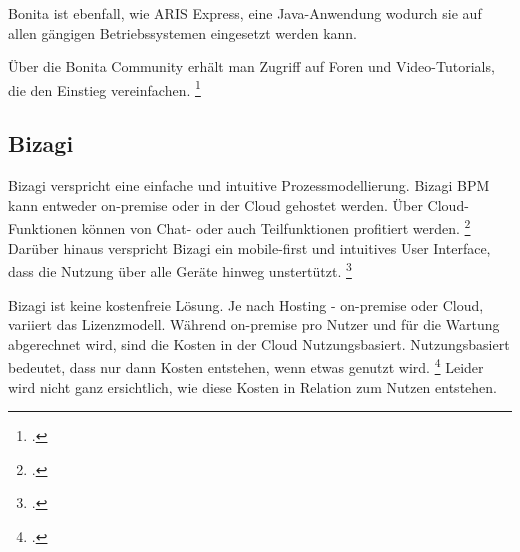 Bonita ist ebenfall, wie ARIS Express, eine Java-Anwendung wodurch sie auf allen
gängigen Betriebssystemen eingesetzt werden kann.

Über die Bonita Community erhält man Zugriff auf Foren und Video-Tutorials, die
den Einstieg vereinfachen. \footcite{bonitalernen}

\subsection{Bizagi}

Bizagi verspricht eine einfache und intuitive Prozessmodellierung.
Bizagi BPM kann entweder on-premise oder in der Cloud gehostet werden.
Über Cloud-Funktionen können von Chat- oder auch Teilfunktionen
profitiert werden. \footcite{bizagi} Darüber hinaus verspricht Bizagi ein
mobile-first und intuitives User Interface, dass die Nutzung über alle Geräte
hinweg unstertützt. \footcite{bizagimobile}


\begin{figure}[H]
\begin{minipage}{\linewidth}
\begin{center}
\end{center}
\end{minipage}
\end{figure}

Bizagi ist keine kostenfreie Lösung. Je nach Hosting - on-premise oder Cloud,
variiert das Lizenzmodell. Während on-premise pro Nutzer und für die Wartung
abgerechnet wird, sind die Kosten in der Cloud Nutzungsbasiert. Nutzungsbasiert
bedeutet, dass nur dann Kosten entstehen, wenn etwas genutzt wird.
\footcite{bizagipricing} Leider wird nicht ganz ersichtlich, wie diese Kosten in
Relation zum Nutzen entstehen.

